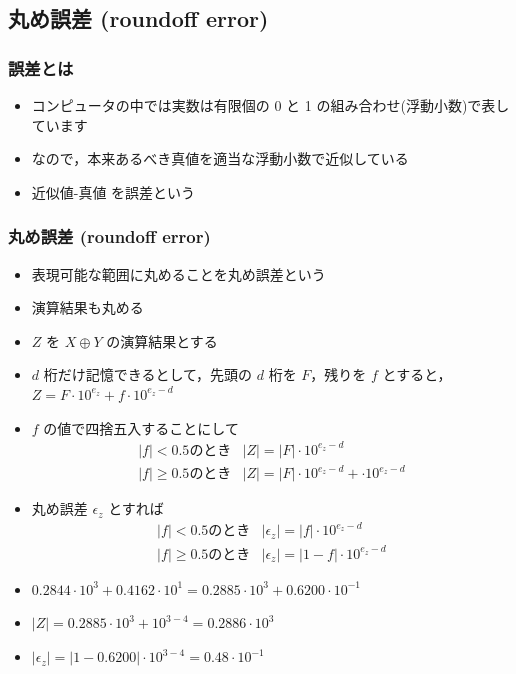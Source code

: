 \subsection{丸め誤差 (roundoff error)}
\begin{frame}[shrink]
\frametitle{誤差とは}
  \begin{itemize}
\item コンピュータの中では実数は有限個の 0 と 1 の組み合わせ(浮動小数)で表しています
\item なので，本来あるべき真値を適当な浮動小数で近似している
\item 近似値-真値 を誤差という
  \end{itemize}
\end{frame}
\begin{frame}[shrink]
\frametitle{丸め誤差 (roundoff error)}
  \begin{itemize}
\item 表現可能な範囲に丸めることを丸め誤差という
\item 演算結果も丸める
\item $Z$ を \(X\oplus Y\) の演算結果とする
\item $d$ 桁だけ記憶できるとして，先頭の $d$ 桁を $F$，残りを $f$ とすると，\(Z=F\cdot 10^{e_z}+f\cdot 10^{e_z-d}\)
\item $f$ の値で四捨五入することにして
    \begin{displaymath}
      \begin{array}{ll}
|f|<0.5 \mbox{のとき} & |Z|=|F|\cdot 10^{e_z-d}\\
|f|\geq 0.5 \mbox{のとき} & |Z|=|F|\cdot 10^{e_z-d}+\cdot 10^{e_z-d}
      \end{array}
    \end{displaymath}
\item 丸め誤差 $\epsilon_z$ とすれば
    \begin{displaymath}
      \begin{array}{ll}
|f|<0.5 \mbox{のとき} & |\epsilon_z|=|f|\cdot 10^{e_z-d}\\
|f|\geq 0.5 \mbox{のとき} & |\epsilon_z|=|1-f|\cdot 10^{e_z-d}
      \end{array}
    \end{displaymath}
  \end{itemize}
  \begin{example}
    \begin{itemize}
\item \(0.2844\cdot 10^3+0.4162\cdot 10^1=0.2885\cdot 10^3+0.6200\cdot 10^{-1}\)
\item \(|Z|=0.2885\cdot 10^3+10^{3-4}=0.2886\cdot 10^3\)
\item \(|\epsilon_z|=|1-0.6200|\cdot 10^{3-4}=0.48\cdot 10^{-1}\)
    \end{itemize}
  \end{example}
\end{frame}
